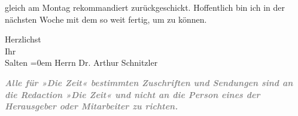                gleich am Montag rekommandiert zurückgeschickt.
               Hoffentlich bin ich in der nächsten Woche mit dem \label{K_L03354-3v}\label{K_L03354-3} so weit fertig, um \label{K_L03354-4v}\label{K_L03354-4} zu können.\pend
           
\pstart
           Herzlichst {\\[\baselineskip]}Ihr {\\[\baselineskip]}\spacefill\mbox{Salten}\pend
           \leftskip=0em{}
\pstart
           \noindent{}Herrn Dr. Arthur Schnitzler\pend
           
\pstart
           \pend
           
\pstart
           \textcolor{gray}{\textbf{\emph{Alle für »Die Zeit«
                        bestimmten Zuschriften und Sendungen sind an die Redaction »Die Zeit« und \textbf{nicht} an die
                        Person eines der Herausgeber oder Mitarbeiter zu richten.}}}\pend
           \endnumbering{}  \newcommand{\dateiname}{L03354}\newcommand{\titel}{Felix Salten an Arthur Schnitzler, 9. 12. 1903}\newcommand{\editorInnen}{Martin Anton Müller und Laura Untner}
